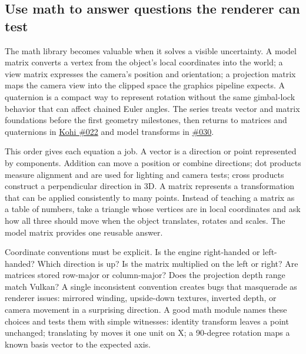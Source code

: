\subsection{Use math to answer questions the renderer can test}\label{06-engine-ii-ch026-use-math-to-answer-questions-the-renderer-can-test}

\hypertarget{06-engine-ii-ch026-use-math-to-answer-questions-the-renderer-can-test}{}

The math library becomes valuable when it solves a visible uncertainty. A model matrix converts a vertex from the object's local coordinates into the world; a view matrix expresses the camera's position and orientation; a projection matrix maps the camera view into the clipped space the graphics pipeline expects. A quaternion is a compact way to represent rotation without the same gimbal-lock behavior that can affect chained Euler angles. The series treats vector and matrix foundations before the first geometry milestones, then returns to matrices and quaternions in \href{https://www.youtube.com/watch?v=nk3KNPrSRqc}{Kohi \#022} and model transforms in \href{https://www.youtube.com/watch?v=xGonaV-OB7E}{\#030}.

This order gives each equation a job. A vector is a direction or point represented by components. Addition can move a position or combine directions; dot products measure alignment and are used for lighting and camera tests; cross products construct a perpendicular direction in 3D. A matrix represents a transformation that can be applied consistently to many points. Instead of teaching a matrix as a table of numbers, take a triangle whose vertices are in local coordinates and ask how all three should move when the object translates, rotates and scales. The model matrix provides one reusable answer.

Coordinate conventions must be explicit. Is the engine right-handed or left-handed? Which direction is up? Is the matrix multiplied on the left or right? Are matrices stored row-major or column-major? Does the projection depth range match Vulkan? A single inconsistent convention creates bugs that masquerade as renderer issues: mirrored winding, upside-down textures, inverted depth, or camera movement in a surprising direction. A good math module names these choices and tests them with simple witnesses: identity transform leaves a point unchanged; translating by  moves it one unit on X; a 90-degree rotation maps a known basis vector to the expected axis.

